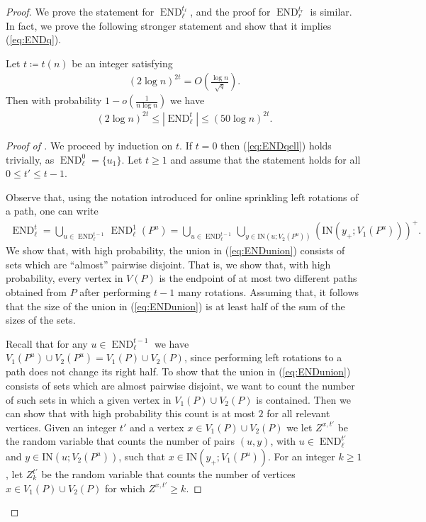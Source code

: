 \documentclass{article}
\DeclareMathOperator{\END}{END}
\newcommand{\IN}[2]{\text{IN}\left(#1; #2 \right)}
\begin{document}
\begin{proof}
	We prove the statement for $\END_{\ell}^{t_{\ell}}$, and the proof for $\END_r^{t_r}$ is similar.
	In fact, we prove the following stronger statement and show that it implies (\ref{eq:ENDq}).
	\begin{claim}
		\label{cl:ENDqell}
		Let $t \coloneqq t(n)$ be an integer satisfying
		\begin{align}
		\label{eq:qp}
		\left(2\log n \right)^{2t} = O\left(\tfrac{\log n}{\sqrt{q}} \right).
		\end{align}
		Then with probability $1 - o\left(\frac{1}{n \log n} \right)$ we have
		\begin{align}
		\label{eq:ENDqell}
		\left(2\log n \right)^{2t} \le \left|\END_{\ell}^t \right| \le \left(50\log n \right)^{2t}.
		\end{align}
	\end{claim}
	
	\begin{proof}[Proof of ]
		We proceed by induction on $t$.
		If $t=0$ then (\ref{eq:ENDqell}) holds trivially, as $\END_{\ell}^0 = \{u_1 \}$.
		Let $t \ge 1$ and assume that the statement holds for all $0 \le t' \le t-1$.
		
		Observe that, using the notation introduced for online sprinkling left rotations of a path, one can write
		\begin{align}
		\label{eq:ENDunion}
		\END_{\ell}^t = \bigcup_{u \in \END_{\ell}^{t-1}} \END_{\ell}^1(P^u) = \bigcup_{u \in \END_{\ell}^{t-1}} \bigcup_{y \in \IN{u}{V_2(P^u)}} \left(\IN{y_+}{V_1(P^u)} \right)^+.
		\end{align}
		We show that, with high probability, the union in (\ref{eq:ENDunion}) consists of sets which are ``almost'' pairwise disjoint.
		That is, we show that, with high probability, every vertex in $V(P)$ is the endpoint of at most two different paths obtained from $P$ after performing $t-1$ many rotations.
		Assuming that, it follows that the size of the union in (\ref{eq:ENDunion}) is at least half of the sum of the sizes of the sets.
		
		Recall that for any $u \in \END_{\ell}^{t-1}$ we have $V_1(P^u)\cup V_2(P^u) = V_1(P)\cup V_2(P)$, since performing left rotations to a path does not change its right half.
		To show that the union in (\ref{eq:ENDunion}) consists of sets which are almost pairwise disjoint, we want to count the number of such sets in which a given vertex in $V_1(P)\cup V_2(P)$ is contained.
		Then we can show that with high probability this count is at most $2$ for all relevant vertices.
		Given an integer $t'$ and a vertex $x \in V_1(P)\cup V_2(P)$ we let $Z^{x,t'}$ be the random variable that counts the number of pairs $(u,y)$, with $u \in \END_{\ell}^{t'}$ and $y \in \IN{u}{V_2(P^u)}$, such that $x \in \IN{y_+}{V_1(P^u)}$.
		For an integer $k \ge 1$, let $Z^{t'}_k$ be the random variable that counts the number of vertices $x \in V_1(P)\cup V_2(P)$ for which $Z^{x,t'} \ge k$.
		

\end{proof}
\end{proof}
\end{document}
